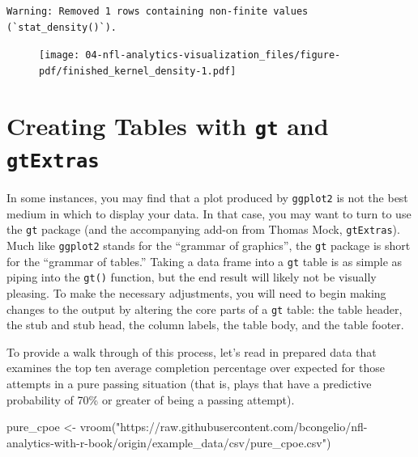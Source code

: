 \documentclass[
  letterpaper,
]{krantz}
\newenvironment{Shaded}{\begin{snugshade}}{\end{snugshade}}
\newcommand{\FunctionTok}[1]{\textcolor[rgb]{0.28,0.35,0.67}{#1}}
\newcommand{\NormalTok}[1]{\textcolor[rgb]{0.00,0.23,0.31}{#1}}
\newcommand{\OtherTok}[1]{\textcolor[rgb]{0.00,0.23,0.31}{#1}}
\newcommand{\StringTok}[1]{\textcolor[rgb]{0.13,0.47,0.30}{#1}}
\begin{document}
\begin{verbatim}
Warning: Removed 1 rows containing non-finite values (`stat_density()`).
\end{verbatim}

\begin{figure}[H]

{\centering \texttt{[image: 04-nfl-analytics-visualization\_files/figure-pdf/finished\_kernel\_density-1.pdf]}

}

\end{figure}

\hypertarget{creating-tables-with-gt-and-gtextras}{%
\section{\texorpdfstring{Creating Tables with \texttt{gt} and
\texttt{gtExtras}}{Creating Tables with gt and gtExtras}}\label{creating-tables-with-gt-and-gtextras}}

In some instances, you may find that a plot produced by \texttt{ggplot2}
is not the best medium in which to display your data. In that case, you
may want to turn to use the \texttt{gt} package (and the accompanying
add-on from Thomas Mock, \texttt{gtExtras}). Much like \texttt{ggplot2}
stands for the ``grammar of graphics'', the \texttt{gt} package is short
for the ``grammar of tables.'' Taking a data frame into a \texttt{gt}
table is as simple as piping into the \texttt{gt()} function, but the
end result will likely not be visually pleasing. To make the necessary
adjustments, you will need to begin making changes to the output by
altering the core parts of a \texttt{gt} table: the table header, the
stub and stub head, the column labels, the table body, and the table
footer.

To provide a walk through of this process, let's read in prepared data
that examines the top ten average completion percentage over expected
for those attempts in a pure passing situation (that is, plays that have
a predictive probability of 70\% or greater of being a passing attempt).

\begin{Shaded}
\begin{Highlighting}[]
\NormalTok{pure\_cpoe }\OtherTok{\textless{}{-}}
  \FunctionTok{vroom}\NormalTok{(}\StringTok{"https://raw.githubusercontent.com/bcongelio/nfl{-}analytics{-}with{-}r{-}book/origin/example\_data/csv/pure\_cpoe.csv"}\NormalTok{)}
\end{Highlighting}
\end{Shaded}
\end{document}
